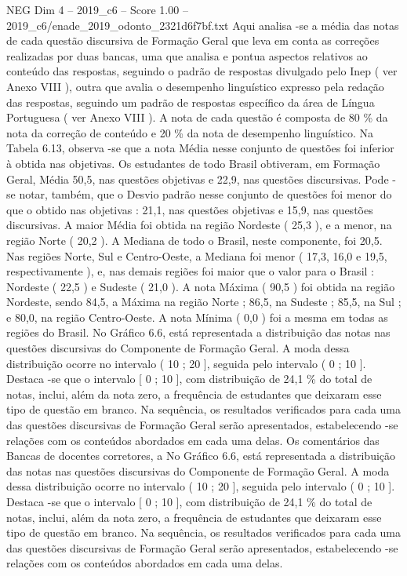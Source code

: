 \begin{textsample}{NEG Dim 4 – 2019\_c6 – Score 1.00 – 2019\_c6/enade\_2019\_odonto\_2321d6f7bf.txt}
Aqui analisa -se a média das notas de cada questão discursiva de Formação Geral que leva em conta as correções realizadas por duas bancas, uma que analisa e pontua aspectos relativos ao conteúdo das respostas, seguindo o padrão de respostas divulgado pelo Inep ( ver Anexo VIII ), outra que avalia o desempenho linguístico expresso pela redação das respostas, seguindo um padrão de respostas específico da área de Língua Portuguesa ( ver Anexo VIII ).
A nota de cada questão é composta de 80 \% da nota da correção de conteúdo e 20 \% da nota de desempenho linguístico.
Na Tabela 6.13, observa -se que a nota Média nesse conjunto de questões foi inferior à obtida nas objetivas.
Os estudantes de todo Brasil obtiveram, em Formação Geral, Média 50,5, nas questões objetivas e 22,9, nas questões discursivas.
Pode -se notar, também, que o Desvio padrão nesse conjunto de questões foi menor do que o obtido nas objetivas : 21,1, nas questões objetivas e 15,9, nas questões discursivas.
A maior Média foi obtida na região Nordeste ( 25,3 ), e a menor, na região Norte ( 20,2 ).
A Mediana de todo o Brasil, neste componente, foi 20,5.
Nas regiões Norte, Sul e Centro-Oeste, a Mediana foi menor ( 17,3, 16,0 e 19,5, respectivamente ), e, nas demais regiões foi maior que o valor para o Brasil : Nordeste ( 22,5 ) e Sudeste ( 21,0 ).
A nota Máxima ( 90,5 ) foi obtida na região Nordeste, sendo 84,5, a Máxima na região Norte ; 86,5, na Sudeste ; 85,5, na Sul ; e 80,0, na região Centro-Oeste.
A nota Mínima ( 0,0 ) foi a mesma em todas as regiões do Brasil.
No Gráfico 6.6, está representada a distribuição das notas nas questões discursivas do Componente de Formação Geral.
A moda dessa distribuição ocorre no intervalo ( 10 ; 20 ], seguida pelo intervalo ( 0 ; 10 ].
Destaca -se que o intervalo [ 0 ; 10 ], com distribuição de 24,1 \% do total de notas, inclui, além da nota zero, a frequência de estudantes que deixaram esse tipo de questão em branco.
Na sequência, os resultados verificados para cada uma das questões discursivas de Formação Geral serão apresentados, estabelecendo -se relações com os conteúdos abordados em cada uma delas.
Os comentários das Bancas de docentes corretores, a No Gráfico 6.6, está representada a distribuição das notas nas questões discursivas do Componente de Formação Geral.
A moda dessa distribuição ocorre no intervalo ( 10 ; 20 ], seguida pelo intervalo ( 0 ; 10 ].
Destaca -se que o intervalo [ 0 ; 10 ], com distribuição de 24,1 \% do total de notas, inclui, além da nota zero, a frequência de estudantes que deixaram esse tipo de questão em branco.
Na sequência, os resultados verificados para cada uma das questões discursivas de Formação Geral serão apresentados, estabelecendo -se relações com os conteúdos abordados em cada uma delas.

\end{textsample}
